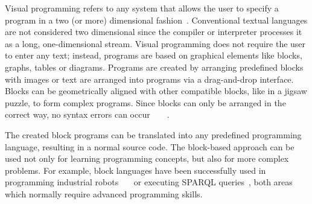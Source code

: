 \documentclass[runningheads]{llncs}
\begin{document}
Visual programming refers to any system that allows the user to specify a program in a two (or more) dimensional fashion~\cite{myers1990taxonomies}.
Conventional textual languages are not considered two dimensional since the compiler or interpreter processes it as a long, one-dimensional stream.
Visual programming does not require the user to enter any text; instead, programs are based on graphical elements like blocks, graphs, tables or diagrams.
Programs are created by arranging predefined blocks with images or text are arranged into programs via a drag-and-drop interface.
Blocks can be geometrically aligned with other compatible blocks, like in a jigsaw puzzle, to form complex programs.
Since blocks can only be arranged in the correct way, no syntax errors can occur~\cite{10.11453341221}~\cite{maloney2010scratch}~\cite{10.1145/1089733.1089734}~\cite{lye2014review}.




The created block programs can be translated into any predefined programming language, resulting in a normal source code. 
The block-based approach can be used not only for learning programming concepts, but also for more complex problems.
For example, block languages have been successfully used in programming industrial robots~\cite{8120406}~\cite{ghazal2016framework}~\cite{tomlein2017visual} or executing SPARQL queries~\cite{7369012}, both areas which normally require advanced programming skills.

\end{document}
